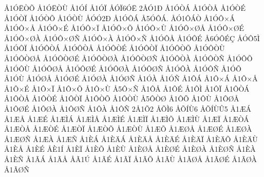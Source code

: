 {^^c51^^d3^^cb^^d2^^d5
^^c51^^d3^^cb^^d2^^d9
^^c51^^d3^^cd
^^c51^^d3^^cf
^^c5^^d3^^cf6^^d3^^cb
2^^c5^^d31^^d0
^^c51^^d3^^d2^^c1
^^c51^^d3^^d2^^c5
^^c51^^d3^^d2^^c9
^^c51^^d3^^d2^^cf
^^c51^^d3^^d2^^d5
^^c51^^d3^^d2^^d9
^^c5^^d3^^d32^^d0
^^c51^^d3^^d4^^c1
^^c55^^d3^^d4^^c1.
^^c5^^d31^^d4^^c1^^d2
^^c51^^d3^^d4^^d7^^c1
^^c51^^d3^^d4^^d7^^c5
^^c51^^d3^^d4^^d7^^c9
^^c51^^d3^^d4^^d7^^cf
^^c51^^d3^^d4^^d7^^d5
^^c51^^d3^^d4^^d7^^d9
^^c51^^d3^^d4^^d7^^d8^^c5
^^c51^^d3^^d4^^d7^^d8^^c9
^^c51^^d3^^d4^^d7^^d8^^c0
^^c51^^d3^^d4^^d7^^d8^^d1
^^c51^^d3^^d4^^d7^^c0
^^c51^^d3^^d4^^d7^^d1
^^c51^^d3^^d4^^c5
^^c51^^d3^^d4^^c9
^^c56^^d3^^d4^^c9^^c7
^^c5^^d3^^d45^^cc
^^c51^^d3^^d4^^cf
^^c51^^d3^^d4^^d2^^c1
^^c51^^d3^^d4^^d2^^c5
^^c51^^d3^^d4^^d2^^c9
^^c51^^d3^^d4^^d2^^cf
^^c51^^d3^^d4^^d2^^d5
^^c51^^d3^^d4^^d2^^d9
^^c51^^d3^^d4^^d2^^d8^^c5
^^c51^^d3^^d4^^d2^^d8^^c9
^^c51^^d3^^d4^^d2^^d8^^c0
^^c51^^d3^^d4^^d2^^d8^^d1
^^c51^^d3^^d4^^d2^^c0
^^c51^^d3^^d4^^d2^^d1
^^c51^^d3^^d4^^d5
^^c51^^d3^^d4^^d9
^^c51^^d3^^d4^^d8^^c5
^^c51^^d3^^d4^^d8^^c9
^^c51^^d3^^d4^^d8^^c0
^^c51^^d3^^d4^^d8^^d1
^^c51^^d3^^d4^^c0
^^c51^^d3^^d4^^d1
^^c51^^d3^^d5
^^c51^^d3^^d9
^^c51^^d3^^d8^^c5
^^c51^^d3^^d8^^c9
^^c51^^d3^^d8^^c0
^^c51^^d3^^d8^^d1
^^c51^^d3^^c0
^^c51^^d3^^d1
^^c51^^d4^^c1
^^c51^^d4^^d7^^c1
^^c51^^d4^^d7^^c5
^^c51^^d4^^d7^^c9
^^c51^^d4^^d7^^cf
^^c51^^d4^^d7^^d5
^^c51^^d4^^d7^^d9
^^c55^^d4^^d7^^d1
^^c51^^d4^^c5
^^c51^^d4^^c9
^^c51^^d4^^cc
^^c51^^d4^^cf
^^c51^^d4^^d2^^c1
^^c51^^d4^^d2^^c5
^^c51^^d4^^d2^^c9
^^c51^^d4^^d2^^cf
^^c51^^d4^^d2^^d5
^^c51^^d4^^d2^^d9
^^c55^^d4^^d2^^d8
^^c51^^d4^^d5
^^c51^^d4^^d9
^^c51^^d4^^d8^^c5
^^c51^^d4^^d8^^c9
^^c51^^d4^^d8^^c0
^^c51^^d4^^d8^^d1
^^c51^^d4^^c0
^^c51^^d4^^d1
2^^c51^^d52
^^c5^^d5^^cc6
^^c5^^d5^^cd^^d96
^^c5^^d5^^cd^^d9^^db5
^^c51^^c6^^c1
^^c51^^c6^^c5
^^c51^^c6^^c9
^^c51^^c6^^cc^^c1
^^c51^^c6^^cc^^c5
^^c51^^c6^^cc^^c9
^^c51^^c6^^cc^^cf
^^c51^^c6^^cc^^d5
^^c51^^c6^^cc^^d9
^^c51^^c6^^cf
^^c51^^c6^^d2^^c1
^^c51^^c6^^d2^^c5
^^c51^^c6^^d2^^c9
^^c51^^c6^^d2^^cf
^^c51^^c6^^d2^^d5
^^c51^^c6^^d2^^d9
^^c51^^c6^^d5
^^c51^^c6^^d8^^c5
^^c51^^c6^^d8^^c9
^^c51^^c6^^d8^^c0
^^c51^^c6^^d8^^d1
^^c51^^c6^^c0
^^c51^^c6^^d1
^^c51^^c8^^c1
^^c51^^c8^^c4^^c1
^^c51^^c8^^c4^^c5
^^c51^^c8^^c4^^c9
^^c51^^c8^^c4^^cf
^^c51^^c8^^c4^^d5
^^c51^^c8^^c4^^d9
^^c51^^c8^^c5
^^c51^^c8^^c9
^^c5^^c81^^cd
^^c51^^c8^^cf
^^c51^^c8^^d5
^^c51^^c8^^d9
^^c51^^c8^^d8^^c5
^^c51^^c8^^d8^^c9
^^c51^^c8^^d8^^c0
^^c51^^c8^^d8^^d1
^^c51^^c8^^c0
^^c51^^c8^^d1
^^c51^^c3^^c1
^^c51^^c3^^c5
^^c5^^c31^^da
^^c51^^c3^^c9
^^c51^^c3^^cf
^^c51^^c3^^d5
^^c51^^c3^^d9
^^c51^^c3^^d8^^c5
^^c51^^c3^^d8^^c9
^^c51^^c3^^d8^^c0
^^c51^^c3^^d8^^d1
}
